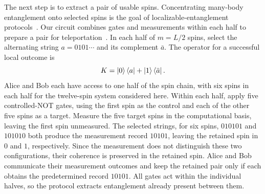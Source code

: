 \documentclass[aps,prl,reprint,amsmath,amssymb,floatfix,superscriptaddress]{revtex4-2}
\begin{document}
The next step is to extract a pair of usable spins. Concentrating many-body entanglement onto selected spins is the goal of localizable-entanglement protocols~\cite{Popp2005}. Our circuit combines gates and measurements within each half to prepare a pair for teleportation~\cite{Teleportation1999}. In each half of $m=L/2$ spins, select the alternating string $a=0101\cdots$ and its complement $\bar a$. The operator for a successful local outcome is
\begin{equation}
K=\ket0\bra a+\ket1\bra{\bar a}.
\label{eq:decoder}
\end{equation}
Alice and Bob each have access to one half of the spin chain, with six spins in each half for the twelve-spin system considered here. Within each half, apply five controlled-NOT gates, using the first spin as the control and each of the other five spins as a target. Measure the five target spins in the computational basis, leaving the first spin unmeasured. The selected strings, for six spins, $010101$ and $101010$ both produce the measurement record $10101$, leaving the retained spin in $0$ and $1$, respectively. Since the measurement does not distinguish these two configurations, their coherence is preserved in the retained spin. Alice and Bob communicate their measurement outcomes and keep the retained pair only if each obtains the predetermined record $10101$. All gates act within the individual halves, so the protocol extracts entanglement already present between them.
\end{document}
